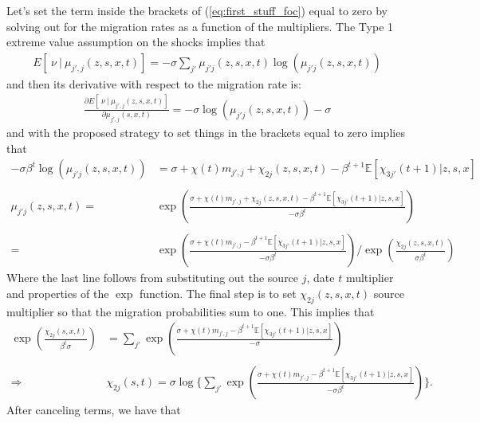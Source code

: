 \documentclass[12pt,pdftex]{article}
\begin{document}
\begin{onehalfspacing}
Let's set the term inside the brackets of (\ref{eq:first_stuff_foc}) equal to zero by solving out for the migration rates as a function of the multipliers. The Type 1 extreme value assumption on the shocks implies that
\begin{align}
E[\ \nu \ | \ \mu_{j',j}(z,s,x,t)] = -\sigma \sum_{j'}\mu_{j'j}(z,s,x,t) \log \left(\mu_{j'j}(z,s,x,t)\right)
\end{align}
and then its derivative with respect to the migration rate is:
\begin{align}
\frac{\partial E[\ \nu \ | \ \mu_{j',j}(z,s,x,t)]}{\partial \mu_{j',j}(s,x,t)} = -\sigma \log \left(\mu_{j'j}(z,s,x,t)\right) - \sigma
\end{align}
and with the proposed strategy to set things in the brackets equal to zero implies that
{\small
\begin{align}
-\sigma \beta^{t} \log \left(\mu_{j'j}(z,s,x,t)\right) & =  \sigma + \chi(t) m_{j',j} + \chi_{2j}(z,s,x,t) - \beta^{t+1}\mathbb{E}\left[\chi_{3j'}(t+1)| z, s, x \right]\\
\nonumber \\
\mu_{j'j}(z,s,x,t) = &\exp \left( \frac{\sigma + \chi(t) m_{j',j} + \chi_{2j}(z,s,x,t) - \beta^{t+1}\mathbb{E}\left[\chi_{3j'}(t+1)|z, s,x \right]}{-\sigma \beta^{t} } \right) \\
\nonumber \\
= &\exp \left( \frac{\sigma + \chi(t) m_{j',j} - \beta^{t+1}\mathbb{E}\left[\chi_{3j'}(t+1)|z, s, x \right]}{-\sigma \beta^{t}} \right) \Bigg / \exp \left(\frac{\chi_{2j}(z,s,x,t)}{\sigma \beta^{t} } \right)
\end{align}}Where the last line follows from substituting out the source $j$, date $t$ multiplier and properties of the $\exp$ function. The final step is to set $\chi_{2j}(z,s,x,t)$ source multiplier so that the migration probabilities sum to one. This implies that
{\small
\begin{align}
\exp \left(\frac{\chi_{2j}(s,x,t)}{\beta^{t} \sigma} \right) & = \sum_{j'} \exp \left( \frac{\sigma + \chi(t) m_{j',j} - \beta^{t+1}\mathbb{E}\left[\chi_{3j'}(t+1) | z, s, x \right]}{-\sigma  } \right) \\
\nonumber \\
\Rightarrow \ \ \ & \chi_{2j}(s,t) = \sigma \log  \Bigg \{  \sum_{j'} \exp \left( \frac{\sigma + \chi(t) m_{j',j} - \beta^{t+1}\mathbb{E}\left[\chi_{3j'}(t+1)| z, s, x \right]}{-\sigma \beta^{t} } \right) \Bigg \}.
\end{align}}
After canceling terms, we have that

\end{onehalfspacing}
\end{document}
